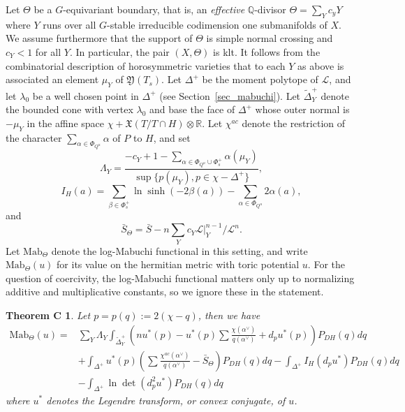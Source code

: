 \documentclass{amsart}
\newtheorem*{thmc}{Theorem C}
\theoremstyle{definition}
\begin{document}
Let $\Theta$ be a $G$-equivariant boundary, that is, an \emph{effective} 
$\mathbb{Q}$-divisor
$\Theta=\sum_Y c_yY$ where $Y$ runs over all $G$-stable irreducible 
codimension one submanifolds of $X$. We assume furthermore 
that the support of $\Theta$ 
is simple normal crossing and $c_Y<1$ for all $Y$. In particular, 
the pair $(X,\Theta)$ is klt. 
It follows from the combinatorial description of horosymmetric varieties 
that to each $Y$ as above is associated an element $\mu_Y$ of 
$\mathfrak{Y}(T_s)$. 
Let $\Delta^+$ be the moment polytope of $\mathcal{L}$, and let 
$\lambda_0$ be a well chosen point in $\Delta^+$ (see Section~\ref{sec_mabuchi}). 
Let $\tilde{\Delta}_Y^+$ denote the bounded cone
with vertex $\lambda_0$ and base the face of $\Delta^+$ whose outer normal 
is $-\mu_Y$ in the affine space $\chi+\mathfrak{X}(T/T\cap H)\otimes \mathbb{R}$.
Let $\chi^{ac}$ denote the restriction of the character 
$\sum_{\alpha\in \Phi_{Q^u}}\alpha$ of $P$ to $H$, 
and set 
\[
\Lambda_Y=\frac{-c_Y+1-\sum_{\alpha\in\Phi_{Q^u}\cup \Phi_s^+}\alpha(\mu_Y)}{
\sup\{p(\mu_Y),p\in\chi-\Delta^+\}},
\] 
\[
I_H(a)=\sum_{\beta\in \Phi_s^+}\ln \sinh(-2\beta(a))
-\sum_{\alpha\in\Phi_{Q^u}}2\alpha(a),
\] 
and 
\[
\bar{S}_{\Theta}=\bar{S}-n\sum_Yc_Y\mathcal{L}|_Y^{n-1}/\mathcal{L}^n.
\]
Let $\mathrm{Mab}_{\Theta}$ denote the log-Mabuchi functional in 
this setting, and write $\mathrm{Mab}_{\Theta}(u)$ for its value on 
the hermitian metric with toric potential $u$. For the question 
of coercivity, the log-Mabuchi functional matters only up to 
normalizing additive and multiplicative constants, so we ignore 
these in the statement.

\begin{thmc}
Let $p=p(q):=2(\chi-q)$, then we have  
\begin{align*}
\mathrm{Mab}_{\Theta}(u) = &
\sum_Y \Lambda_Y 
\int_{\tilde{\Delta}^+_Y} (nu^*(p)-u^*(p)\sum \frac{\chi(\alpha^{\vee})}{q(\alpha^{\vee})} +d_pu^*(p))P_{DH}(q)dq \\
& 
+\int_{\Delta^+} u^*(p)(\sum \frac{\chi^{ac}(\alpha^{\vee})}{q(\alpha^{\vee})}-\bar{S}_{\Theta})P_{DH}(q)dq 
-\int_{\Delta^+}I_H(d_pu^*)P_{DH}(q)dq \\
&
-\int_{\Delta^+}\ln\det (d^2_pu^*)P_{DH}(q)dq 
\end{align*}
where $u^*$ denotes the Legendre transform, or convex conjugate, of $u$.
\end{thmc}
\end{document}
